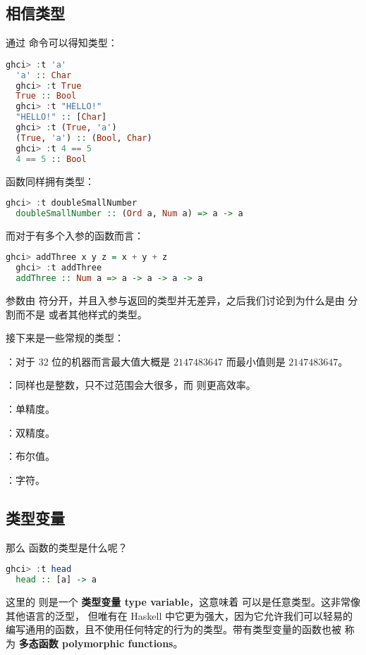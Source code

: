 \documentclass[./main.tex]{subfiles}
\begin{document}
\subsection*{相信类型}

通过  命令可以得知类型：

\begin{lstlisting}[language=Haskell]
  ghci> :t 'a'
  'a' :: Char
  ghci> :t True
  True :: Bool
  ghci> :t "HELLO!"
  "HELLO!" :: [Char]
  ghci> :t (True, 'a')
  (True, 'a') :: (Bool, Char)
  ghci> :t 4 == 5
  4 == 5 :: Bool
\end{lstlisting}

函数同样拥有类型：

\begin{lstlisting}[language=Haskell]
  ghci> :t doubleSmallNumber
  doubleSmallNumber :: (Ord a, Num a) => a -> a
\end{lstlisting}

而对于有多个入参的函数而言：

\begin{lstlisting}[language=Haskell]
  ghci> addThree x y z = x + y + z
  ghci> :t addThree
  addThree :: Num a => a -> a -> a -> a
\end{lstlisting}

参数由 \acode{->} 符分开，并且入参与返回的类型并无差异，之后我们讨论到为什么是由 \acode{->} 分割而不是
 或者其他样式的类型。

接下来是一些常规的类型：

：对于 32 位的机器而言最大值大概是 $2147483647$ 而最小值则是 $2147483647$。

：同样也是整数，只不过范围会大很多，而  则更高效率。

：单精度。

：双精度。

：布尔值。

：字符。

\subsection*{类型变量}

那么  函数的类型是什么呢？

\begin{lstlisting}[language=Haskell]
  ghci> :t head
  head :: [a] -> a
\end{lstlisting}

这里的  则是一个 \textbf{类型变量 type variable}，这意味着  可以是任意类型。这非常像其他语言的泛型，
但唯有在 Haskell 中它更为强大，因为它允许我们可以轻易的编写通用的函数，且不使用任何特定的行为的类型。带有类型变量的函数也被
称为 \textbf{多态函数 polymorphic functions}。
\end{document}

